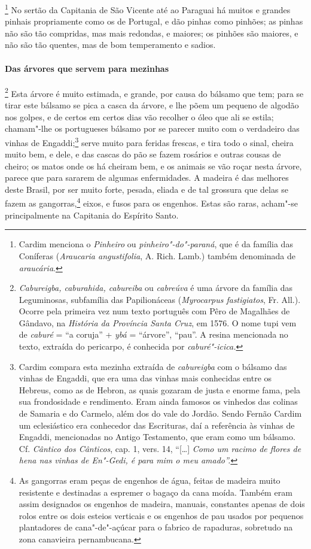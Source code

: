 \footnote{ Cardim menciona o \textit{Pinheiro} ou
\textit{pinheiro"-do"-paraná}, que é da família das Coníferas
(\textit{Araucaria angustifolia}, A. Rich. Lamb.) também denominada de
\textit{araucária}.} No sertão da Capitania de São Vicente 
até ao Paraguai há muitos e grandes pinhais propriamente como os de
Portugal, e dão pinhas como pinhões; as pinhas não são tão compridas,
mas mais redondas, e maiores; os pinhões são maiores, e não são tão
quentes, mas de bom temperamento e sadios.

\paragraph{Das árvores que servem para mezinhas}

\footnote{ \textit{Cabureigba, caburahida,
cabureiba} ou \textit{cabreúva} é uma árvore da família das
Leguminosas, subfamília das Papilionáceas (\textit{Myrocarpus
fastigiatos}, Fr. All.). Ocorre pela primeira vez num texto português
com Pêro de Magalhães de Gândavo, na \textit{História da Província Santa
Cruz}, em 1576. O nome tupi vem de \textit{caburé} = ``a
coruja'' + \textit{ybá} = ``árvore'', ``pau''. A resina mencionada no texto,
extraída do pericarpo, é conhecida por
\textit{caburé"-icica.}} Esta árvore é muito estimada, e
grande, por causa do bálsamo que tem; para se tirar este bálsamo se
pica a casca da árvore, e lhe põem um pequeno de algodão nos golpes, e
de certos em certos dias vão recolher o óleo que ali se estila;
chamam"-lhe os portugueses bálsamo por se parecer muito com o verdadeiro
das vinhas de Engaddi;\footnote{ Cardim compara esta mezinha extraída
de \textit{cabureigba} com o bálsamo das vinhas de Engaddi, que era uma
das vinhas mais conhecidas entre os Hebreus, como as de Hebron, as
quais gozaram de justa e enorme fama, pela sua frondosidade e
rendimento. Eram ainda famosos os vinhedos das colinas de Samaria e do
Carmelo, além dos do vale do Jordão. Sendo Fernão Cardim um
eclesiástico era conhecedor das Escrituras, daí a referência às vinhas
de Engaddi, mencionadas no Antigo Testamento, que eram como um bálsamo.
Cf. \textit{Cântico dos Cânticos}, cap. 1, vers. 14, ``[\ldots{}] \textit{Como um
racimo de flores de hena nas vinhas de En"-Gedi, é para mim o meu
amado''.}} serve muito para feridas frescas, e tira todo o sinal,
cheira muito bem, e dele, e das cascas do pão se fazem rosários e
outras cousas de cheiro; os matos onde os há cheiram bem, e os animais
se vão roçar nesta árvore, parece que para sararem de algumas
enfermidades. A madeira é das melhores deste Brasil, por ser muito
forte, pesada, eliada e de tal grossura que delas se fazem as 
gangorras,\footnote{ As gangorras eram peças de engenhos de água, feitas de
madeira muito resistente e destinadas a espremer o bagaço da cana
moída. Também eram assim designados os engenhos de madeira, manuais,
constantes apenas de dois rolos entre os dois esteios verticais e os
engenhos de pau usados por pequenos plantadores de cana"-de"-açúcar para
o fabrico de rapaduras, sobretudo na zona canavieira pernambucana.}
eixos, e fusos para os engenhos. Estas são raras, acham"-se
principalmente na Capitania do Espírito Santo.

